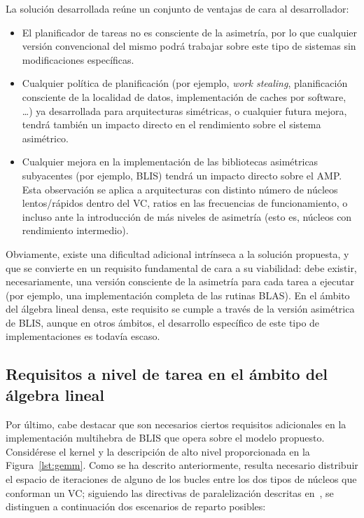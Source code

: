 La solución desarrollada reúne un conjunto de ventajas de cara al desarrollador:

\begin{itemize}
\item El planificador de tareas no es consciente de la asimetría, por lo que cualquier versión convencional 
      del mismo podrá trabajar sobre este tipo de sistemas sin modificaciones específicas. 
\item Cualquier política de planificación (por ejemplo, {\em work stealing}, planificación consciente de la localidad de datos,
      implementación de caches por software, \ldots) ya desarrollada para arquitecturas simétricas, o cualquier futura mejora,
      tendrá también un impacto directo en el rendimiento sobre el sistema asimétrico.
\item Cualquier mejora en la implementación de las bibliotecas asimétricas subyacentes (por ejemplo, BLIS) tendrá un impacto directo
      sobre el AMP. Esta observación se aplica a arquitecturas con distinto número de núcleos lentos/rápidos dentro del VC, ratios
      en las frecuencias de funcionamiento, o incluso ante la introducción de más niveles de asimetría (esto es, núcleos con rendimiento
      intermedio).
\end{itemize}

Obviamente, existe una dificultad adicional intrínseca a la solución propuesta, y que se convierte en un requisito fundamental de cara
a su viabilidad: debe existir, necesariamente, una versión consciente de la asimetría para cada tarea a ejecutar (por ejemplo, una implementación
completa de las rutinas BLAS). En el ámbito del álgebra lineal densa, este requisito se cumple a través de la versión asimétrica de BLIS, aunque
en otros ámbitos, el desarrollo específico de este tipo de implementaciones es todavía escaso.

\subsection{Requisitos a nivel de tarea en el ámbito del álgebra lineal}

Por último, cabe destacar que son necesarios ciertos requisitos adicionales en la implementación multihebra de BLIS
que opera sobre el modelo propuesto. Considérese el kernel \gemm y la descripción de alto nivel proporcionada en la Figura~\ref{lst:gemm}. 
Como se ha descrito anteriormente, resulta necesario distribuir el espacio de iteraciones de alguno de los bucles entre los dos tipos de núcleos
que conforman un VC; siguiendo las directivas de paralelización descritas en~\cite{BLIS3}, se distinguen a continuación dos escenarios de reparto posibles:


